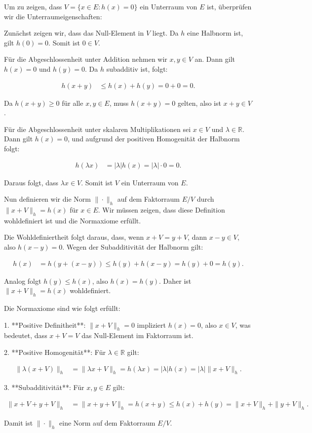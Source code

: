 Um zu zeigen, dass $V = \{x \in E : h(x) = 0\}$ ein Unterraum von $E$ ist, überprüfen wir die Unterraumeigenschaften:

Zunächst zeigen wir, dass das Null-Element in $V$ liegt. Da $h$ eine Halbnorm ist, gilt $h(0) = 0$. Somit ist $0 \in V$.

Für die Abgeschlossenheit unter Addition nehmen wir $x, y \in V$ an. Dann gilt $h(x) = 0$ und $h(y) = 0$. Da $h$ subadditiv ist, folgt:

\begin{align*}
h(x + y) &\leq h(x) + h(y) = 0 + 0 = 0.
\end{align*}

Da $h(x + y) \geq 0$ für alle $x, y \in E$, muss $h(x + y) = 0$ gelten, also ist $x + y \in V$.

Für die Abgeschlossenheit unter skalaren Multiplikationen sei $x \in V$ und $\lambda \in \mathbb{R}$. Dann gilt $h(x) = 0$, und aufgrund der positiven Homogenität der Halbnorm folgt:

\begin{align*}
h(\lambda x) &= |\lambda| h(x) = |\lambda| \cdot 0 = 0.
\end{align*}

Daraus folgt, dass $\lambda x \in V$. Somit ist $V$ ein Unterraum von $E$.

Nun definieren wir die Norm $\|\cdot\|_h$ auf dem Faktorraum $E / V$ durch $\|x + V\|_h = h(x)$ für $x \in E$. Wir müssen zeigen, dass diese Definition wohldefiniert ist und die Normaxiome erfüllt.

Die Wohldefiniertheit folgt daraus, dass, wenn $x + V = y + V$, dann $x - y \in V$, also $h(x - y) = 0$. Wegen der Subadditivität der Halbnorm gilt:

\begin{align*}
h(x) &= h(y + (x - y)) \leq h(y) + h(x - y) = h(y) + 0 = h(y).
\end{align*}

Analog folgt $h(y) \leq h(x)$, also $h(x) = h(y)$. Daher ist $\|x + V\|_h = h(x)$ wohldefiniert.

Die Normaxiome sind wie folgt erfüllt:

1. **Positive Definitheit**: $\|x + V\|_h = 0$ impliziert $h(x) = 0$, also $x \in V$, was bedeutet, dass $x + V = V$ das Null-Element im Faktorraum ist.

2. **Positive Homogenität**: Für $\lambda \in \mathbb{R}$ gilt:

\begin{align*}
\|\lambda(x + V)\|_h &= \|\lambda x + V\|_h = h(\lambda x) = |\lambda| h(x) = |\lambda| \|x + V\|_h.
\end{align*}

3. **Subadditivität**: Für $x, y \in E$ gilt:

\begin{align*}
\|x + V + y + V\|_h &= \|x + y + V\|_h = h(x + y) \leq h(x) + h(y) = \|x + V\|_h + \|y + V\|_h.
\end{align*}

Damit ist $\|\cdot\|_h$ eine Norm auf dem Faktorraum $E / V$.

